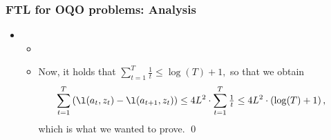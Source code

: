 \documentclass[11pt,compress,t,notes=noshow, xcolor=table]{beamer}
\begin{document}
\begin{frame} 
	\frametitle{FTL for OQO problems: Analysis}
	\small
	\begin{itemize}	
		\item[]
		\begin{itemize}	
				\item[]
				
				\pause			
				 \item Now, it holds that   $\sum\limits_{t=1}^T \tfrac{1}{t} \leq \log(T) + 1,$ so that we obtain
				 \begin{equation*}
						\begin{split}
								\sum\limits_{t=1}^T \left(\l(a_t,z_t) - \l(a_{t+1},z_t)  \right) 
								 &\leq 4L^2 \cdot \sum\limits_{t=1}^T \tfrac{1}{t} 
								  \leq  4L^2 \cdot \left(\log(T) + 1 \right),
							\end{split}
					\end{equation*}
				which is what we wanted to prove. \qed
			\end{itemize}
	\end{itemize}
\end{frame}


%
\endlecture
\end{document}
